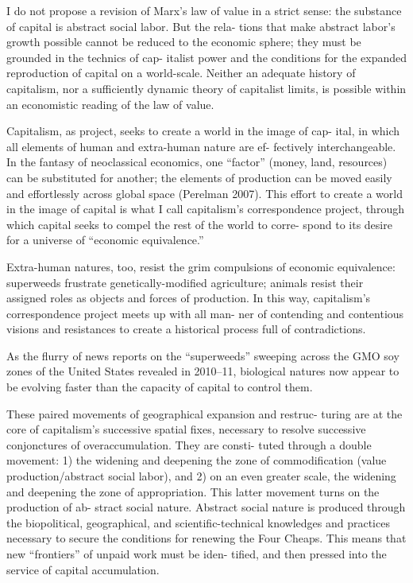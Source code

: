 \documentclass[
]{book}
\begin{document}
I do not propose a revision of Marx's law of value in a strict
sense: the substance of capital is abstract social labor. But the rela-
tions that make abstract labor's growth possible cannot be reduced
to the economic sphere; they must be grounded in the technics of cap-
italist power and the conditions for the expanded reproduction of
capital on a world-scale. Neither an adequate history of capitalism,
nor a sufficiently dynamic theory of capitalist limits, is possible within
an economistic reading of the law of value.

Capitalism, as project, seeks to create a world in the image of cap-
ital, in which all elements of human and extra-human nature are ef-
fectively interchangeable. In the fantasy of neoclassical economics,
one ``factor'' (money, land, resources) can be substituted for another;
the elements of production can be moved easily and effortlessly
across global space (Perelman 2007). This effort to create a world in
the image of capital is what I call capitalism's correspondence project,
through which capital seeks to compel the rest of the world to corre-
spond to its desire for a universe of ``economic equivalence.''

Extra-human natures, too, resist the grim compulsions of economic
equivalence: superweeds frustrate genetically-modified agriculture;
animals resist their assigned roles as objects and forces of production.
In this way, capitalism's correspondence project meets up with all man-
ner of contending and contentious visions and resistances to create
a historical process full of contradictions.

As the flurry of news reports on the ``superweeds'' sweeping across the
GMO soy zones of the United States revealed in 2010--11, biological
natures now appear to be evolving faster than the capacity of capital
to control them.

These paired movements of geographical expansion and restruc-
turing are at the core of capitalism's successive spatial fixes, necessary
to resolve successive conjonctures of overaccumulation. They are consti-
tuted through a double movement: 1) the widening and deepening
the zone of commodification (value production/abstract social labor),
and 2) on an even greater scale, the widening and deepening the zone
of appropriation. This latter movement turns on the production of ab-
stract social nature. Abstract social nature is produced through the
biopolitical, geographical, and scientific-technical knowledges and
practices necessary to secure the conditions for renewing the Four
Cheaps. This means that new ``frontiers'' of unpaid work must be iden-
tified, and then pressed into the service of capital accumulation.
\end{document}
